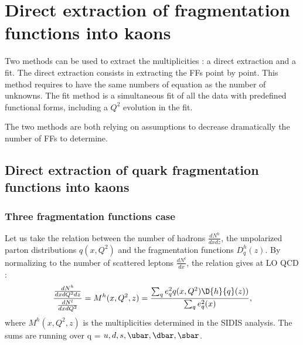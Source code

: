 
\chapter{Direct extraction of fragmentation functions into kaons}


Two methods can be used to extract the multiplicities : a direct extraction and a fit. The direct extraction consists in extracting the FFs point by point. This method requires to have the same numbers of equation as the number of unknowns. The fit method is a simultaneous fit of all the data with predefined functional forms, including a $Q^2$ evolution in the fit.

The two methods are both relying on assumptions to decrease dramatically the number of FFs to determine.

\section{Direct extraction of quark fragmentation functions into kaons}

\subsection{Three fragmentation functions case}

Let us take the relation between the number of hadrons $\frac{dN^h}{dxdz}$, the unpolarized parton distributions $q(x,Q^2)$ and the fragmentation functions $D^h_q(z)$. By normalizing to the number of scattered leptons $\frac{dN^l}{dx}$, the relation gives at LO QCD :
%
\begin{equation} \label{eq:mult_basic}
  \frac{\frac{dN^h}{dxdQ^2dz}}{\frac{dN^l}{dxdQ^2}} = M^h(x,Q^2,z) = \frac{\sum_{q}e^2_qq(x,Q^2)\D{h}{q}(z))}{\sum_{q}e^2_q(x)},
\end{equation}
%
where $M^h(x,Q^2,z)$ is the multiplicities determined in the SIDIS analysis. The sums are running over q = $u,d,s,\ubar,\dbar,\sbar$.

